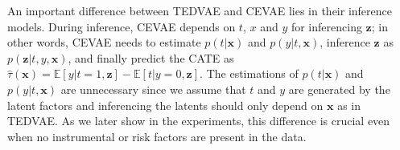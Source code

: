 \documentclass[letterpaper]{article} %
\begin{document}
An important difference between TEDVAE and CEVAE lies in their inference models. 
During inference, CEVAE depends on $t$, $x$ and $y$ for inferencing $\mathbf{z}$; in other words, CEVAE needs to estimate $p(t|\mathbf{x})$ and $p(y|t,\mathbf{x})$, inference $\mathbf{z}$ as $p(\mathbf{z}|t,y,\mathbf{x})$, and finally predict the CATE as $\hat{\tau} (\mathbf{x}) = \mathbb{E}[y|t=1,\mathbf{z}] - \mathbb{E}[t|y=0, \mathbf{z}]$.
The estimations of $p(t|\mathbf{x})$ and $p(y|t,\mathbf{x})$ are unnecessary since we assume that $t$ and $y$ are generated by the latent factors and inferencing the latents should only depend on $\mathbf{x}$ as in TEDVAE. 
As we later show in the experiments, this difference is crucial even when no instrumental or risk factors are present in the data. 


\end{document}
